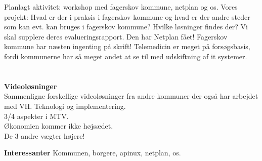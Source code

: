 Planlagt aktivitet: workshop med fagerskov kommune, netplan og os.
Vores projekt: Hvad er der i praksis i fagerskov kommune og hvad er der andre steder som kan evt. kan bruges i fagerskov kommune? Hvilke løsninger findes der?
Vi skal supplere deres evalueringsrapport. Den har Netplan fået!
Fagerskov kommune har næsten ingenting på skrift! 
Telemedicin er meget på forsøgsbasis, fordi kommunerne har så meget andet at se til med udskiftning af it systemer.\\
\\\\
\textbf{Videoløsninger}
\\
Sammenligne forskellige videoløsninger fra andre kommuner der også har arbejdet med VH.
Teknologi og implementering.\\
3/4 aspekter i MTV.\\
Økonomien kommer ikke højsædet.\\
De 3 andre vægter højere!

\textbf{Interessanter}
Kommunen, borgere, apinux, netplan, os. 
\\